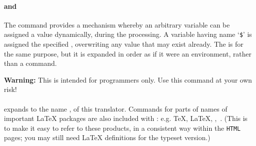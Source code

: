 \paragraph*{\texttt{}%
\texttt{} and 
\texttt{}%
\texttt{}\label{HTMLset}}
\begin{changebar}
The  command provides a mechanism whereby an arbitrary
\Perl{} variable can be assigned a value dynamically, during the \latextohtml{} processing. 
A variable having name `\texttt{\$}' is assigned the specified ,
overwriting any value that may exist already. The  is for the same purpose,
but it is expanded in order as if it were an environment, rather than a command.

\medskip\noindent
\textbf{Warning: }This is intended for \Perl{} programmers only.
Use this command at your own risk!
\end{changebar}

\htmlrule[width=300]
%
%
%
\paragraph*{\label{l2hname}} 
\begin{changebar}
expands to the name \latextohtml, of this translator.
Commands for parts of names of important \LaTeX{} packages are also 
included with \latextohtml: e.g. \TeX, \LaTeX, \AmS, \Xy\,.
(This is to make it easy to refer to these products, in a consistent way
within the \texttt{HTML} pages; you may still need \LaTeX{} definitions
for the typeset version.)
\end{changebar}
\medskip



